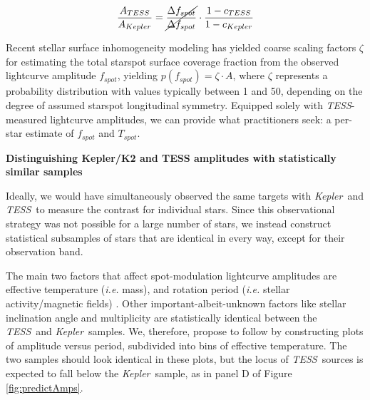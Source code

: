 \documentclass[letterpaper,11pt]{article}
\newcommand{\tess}{{\it TESS}}
\newcommand{\kepler}{{\it Kepler}}
\begin{document}
$$ \frac{A_{TESS}}{A_{Kepler}} = \cancel{\frac{\Delta f_{spot}}{\Delta f_{spot}}} \cdot \frac{1-c_{TESS}}{1-c_{Kepler}} $$

Recent stellar surface inhomogeneity modeling \citep{2018ApJ...853..122R, 2018ApJ...868..143G, 2018ApJ...865..142B} has yielded coarse scaling factors $\zeta$ for estimating the total starspot surface coverage fraction from the observed lightcurve amplitude $f_{spot}$, yielding $ p(f_{spot}) = \zeta \cdot A $, where $\zeta$ represents a probability distribution with values typically between 1 and 50, depending on the degree of assumed starspot longitudinal symmetry.  Equipped solely with \tess-measured lightcurve amplitudes, we can provide what practitioners seek: a per-star estimate of $f_{spot}$ and $T_{spot}$.

\textbf{Distinguishing Kepler/K2 and TESS amplitudes with statistically similar samples}

Ideally, we would have simultaneously observed the same targets with \kepler\ and \tess\ to measure the contrast for individual stars.  Since this observational strategy was not possible for a large number of stars, we instead construct statistical subsamples of stars that are identical in every way, except for their observation band.

The main two factors that affect spot-modulation lightcurve amplitudes are effective temperature (\emph{i.e.} mass), and rotation period (\emph{i.e.} stellar activity/magnetic fields) \citep{2014ApJS..211...24M}.  Other important-albeit-unknown factors like stellar inclination angle and multiplicity are statistically identical between the \tess\ and \kepler\ samples.  We, therefore, propose to follow \citet{2014ApJS..211...24M} by constructing plots of amplitude versus period, subdivided into bins of effective temperature.  The two samples should look identical in these plots, but the locus of \tess\ sources is expected to fall below the \kepler\ sample, as in panel D of Figure \ref{fig:predictAmps}.
\end{document}
